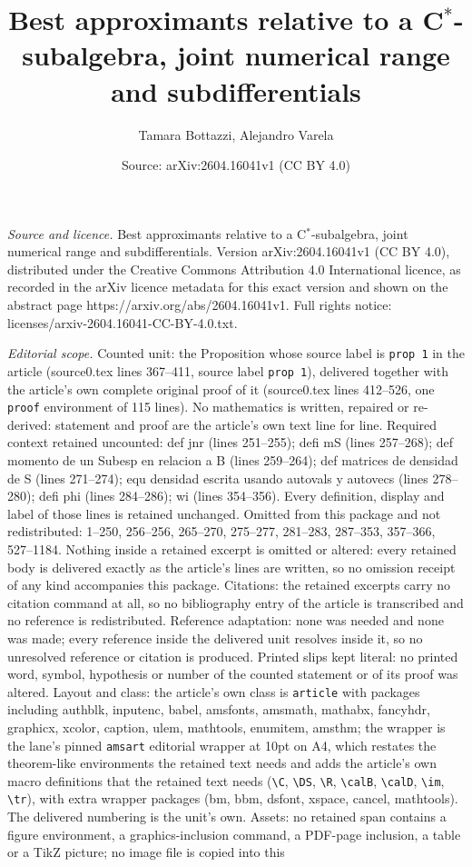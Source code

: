 \documentclass[10pt,a4paper]{amsart}
\title[Best approximants relative to a C$^*$-subalgebra, joint nume]{Best approximants relative to a C$^*$-subalgebra, joint numerical range and subdifferentials}
\author{Tamara Bottazzi, Alejandro Varela}
\date{Source: arXiv:2604.16041v1 (CC BY 4.0)}
\begin{document}
\maketitle

\noindent\emph{Source and licence.} Best approximants relative to a C$^*$-subalgebra, joint numerical range and subdifferentials. Version arXiv:2604.16041v1 (CC BY 4.0), distributed under the Creative Commons Attribution 4.0 International licence, as recorded in the arXiv licence metadata for this exact version and shown on the abstract page https://arxiv.org/abs/2604.16041v1. Full rights notice: licenses/arxiv-2604.16041-CC-BY-4.0.txt.\par\smallskip

\noindent\textit{Editorial scope.} Counted unit: the Proposition whose source label is \texttt{prop 1} in the article (source0.tex lines 367--411, source label \texttt{prop 1}), delivered together with the article's own complete original proof of it (source0.tex lines 412--526, one \texttt{proof} environment of 115 lines). No mathematics is written, repaired or re-derived: statement and proof are the article's own text line for line. Required context retained uncounted: def jnr (lines 251--255); defi mS (lines 257--268); def momento de un Subesp en relacion a B (lines 259--264); def matrices de densidad de S (lines 271--274); equ densidad escrita usando autovals y autovecs (lines 278--280); defi phi (lines 284--286); wi (lines 354--356). Every definition, display and label of those lines is retained unchanged. Omitted from this package and not redistributed: 1--250, 256--256, 265--270, 275--277, 281--283, 287--353, 357--366, 527--1184. Nothing inside a retained excerpt is omitted or altered: every retained body is delivered exactly as the article's lines are written, so no omission receipt of any kind accompanies this package. Citations: the retained excerpts carry no citation command at all, so no bibliography entry of the article is transcribed and no reference is redistributed. Reference adaptation: none was needed and none was made; every reference inside the delivered unit resolves inside it, so no unresolved reference or citation is produced. Printed slips kept literal: no printed word, symbol, hypothesis or number of the counted statement or of its proof was altered. Layout and class: the article's own class is \texttt{article} with packages including authblk, inputenc, babel, amsfonts, amsmath, mathabx, fancyhdr, graphicx, xcolor, caption, ulem, mathtools, enumitem, amsthm; the wrapper is the lane's pinned \texttt{amsart} editorial wrapper at 10pt on A4, which restates the theorem-like environments the retained text needs and adds the article's own macro definitions that the retained text needs (\texttt{\textbackslash C}, \texttt{\textbackslash DS}, \texttt{\textbackslash R}, \texttt{\textbackslash calB}, \texttt{\textbackslash calD}, \texttt{\textbackslash im}, \texttt{\textbackslash tr}), with extra wrapper packages (bm, bbm, dsfont, xspace, cancel, mathtools). The delivered numbering is the unit's own. Assets: no retained span contains a figure environment, a graphics-inclusion command, a PDF-page inclusion, a table or a TikZ picture; no image file is copied into this 
\end{document}
